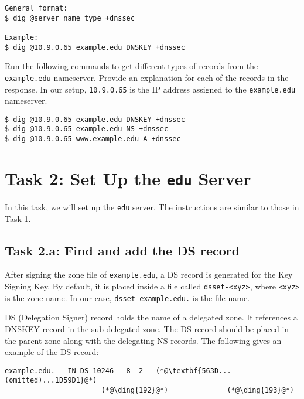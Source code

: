 \begin{lstlisting}
General format:
$ dig @server name type +dnssec

Example:
$ dig @10.9.0.65 example.edu DNSKEY +dnssec
\end{lstlisting}
 

Run the following commands to get different types of records 
from the \texttt{example.edu} nameserver. Provide an explanation
for each of the records in the response. 
In our setup, \texttt{10.9.0.65} is the IP address 
assigned to the \texttt{example.edu} nameserver.

\begin{lstlisting}
$ dig @10.9.0.65 example.edu DNSKEY +dnssec
$ dig @10.9.0.65 example.edu NS +dnssec
$ dig @10.9.0.65 www.example.edu A +dnssec
\end{lstlisting}
 


\section{Task 2: Set Up the \texttt{edu} Server}


In this task, we will set up the \texttt{edu} server. 
The instructions are similar to those in Task 1. 


\subsection{Task 2.a: Find and add the DS record}


After signing the zone file of \texttt{example.edu}, a DS record is generated for the Key
Signing Key. By default, it is placed inside a file called \texttt{dsset-<xyz>}, where
\texttt{<xyz>} is the zone name. In our case, \texttt{dsset-example.edu.} is the file name.


DS (Delegation Signer) record holds the name of a delegated zone. It 
references a DNSKEY record in the sub-delegated zone. 
The DS record should be placed in the parent zone along with the delegating NS records.
The following gives an example of the DS record:


\begin{lstlisting}
example.edu.   IN DS 10246   8  2   (*@\textbf{563D...(omitted)...1D59D1}@*)
                       (*@\ding{192}@*)              (*@\ding{193}@*)
\end{lstlisting}

